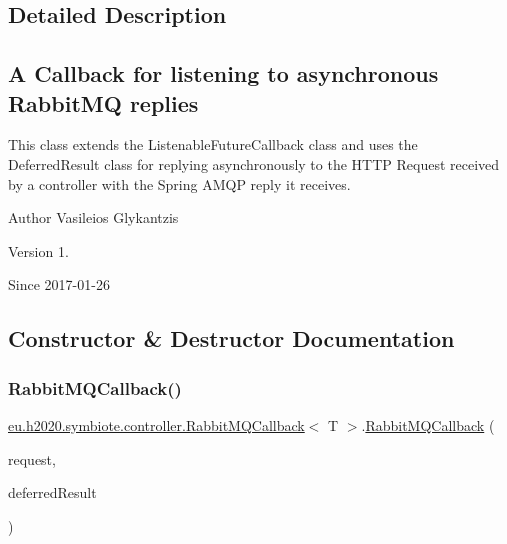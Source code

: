 \subsection{Detailed Description}
\subsection*{A Callback for listening to asynchronous Rabbit\+MQ replies}

This class extends the Listenable\+Future\+Callback class and uses the Deferred\+Result class for replying asynchronously to the H\+T\+TP Request received by a controller with the Spring A\+M\+QP reply it receives.

\begin{DoxyAuthor}{Author}
Vasileios Glykantzis 
\end{DoxyAuthor}
\begin{DoxyVersion}{Version}
1. 
\end{DoxyVersion}
\begin{DoxySince}{Since}
2017-\/01-\/26 
\end{DoxySince}


\subsection{Constructor \& Destructor Documentation}
\mbox{\label{classeu_1_1h2020_1_1symbiote_1_1controller_1_1RabbitMQCallback_af36ac8a5a331017d599f76c768a7bdab}} 
\subsubsection{\texorpdfstring{Rabbit\+M\+Q\+Callback()}{RabbitMQCallback()}}
{\footnotesize\ttfamily \hyperlink{classeu_1_1h2020_1_1symbiote_1_1controller_1_1RabbitMQCallback}{eu.\+h2020.\+symbiote.\+controller.\+Rabbit\+M\+Q\+Callback}$<$ T $>$.\hyperlink{classeu_1_1h2020_1_1symbiote_1_1controller_1_1RabbitMQCallback}{Rabbit\+M\+Q\+Callback} (\begin{DoxyParamCaption}\item[{String}]{request,  }\item[{Deferred\+Result}]{deferred\+Result }\end{DoxyParamCaption})}

